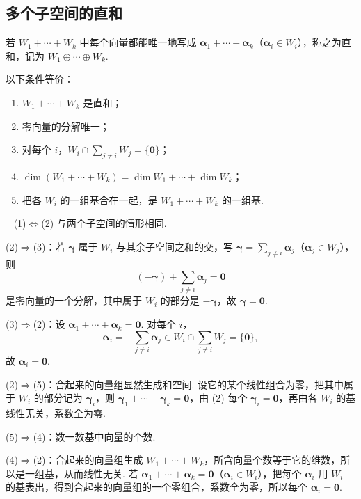 \documentclass[lang=cn,10.5pt,scheme=chinese,toc=twocol,section,chinesefont=nofont,
twoside,citestyle=gb7714-2015,bibstyle=gb7714-2015]{elegantbook}
\newcommand{\vv}[1]{\boldsymbol{#1}}
\newcommand{\zero}{\boldsymbol{0}}          %
\numberwithin{equation}{section}   %
\newcommand*{\lnlabel}[1]{{\sffamily\bfseries\color{black}#1}}
\renewenvironment{proof}{%
	\par\noindent\lnlabel{\proofname}\;\ \color{black!90}\cfs}{\par}
\begin{document}
\subsection{多个子空间的直和}

\begin{definition}
  若 $W_1+\cdots+W_k$ 中每个向量都能唯一地写成 $\vv\alpha_1+\cdots+\vv\alpha_k$（$\vv\alpha_i\in W_i$），称之为直和，记为 $W_1\oplus\cdots\oplus W_k$.
\end{definition}

\begin{theorem}
  \label{thm:dsummulti}
  以下条件等价：
  \begin{enumerate}
    \item $W_1+\cdots+W_k$ 是直和；
    \item 零向量的分解唯一；
    \item 对每个 $i$，$W_i\cap\sum_{j\ne i}W_j=\{\zero\}$；
    \item $\dim(W_1+\cdots+W_k)=\dim W_1+\cdots+\dim W_k$；
    \item 把各 $W_i$ 的一组基合在一起，是 $W_1+\cdots+W_k$ 的一组基.
  \end{enumerate}
\end{theorem}
\begin{proof}
  (1)$\Leftrightarrow$(2) 与两个子空间的情形相同.

  (2)$\Rightarrow$(3)：若 $\vv\gamma$ 属于 $W_i$ 与其余子空间之和的交，写 $\vv\gamma=\sum_{j\ne i}\vv\alpha_j$（$\vv\alpha_j\in W_j$），则
  \[(-\vv\gamma)+\sum_{j\ne i}\vv\alpha_j=\zero\]
  是零向量的一个分解，其中属于 $W_i$ 的部分是 $-\vv\gamma$，故 $\vv\gamma=\zero$.

  (3)$\Rightarrow$(2)：设 $\vv\alpha_1+\cdots+\vv\alpha_k=\zero$. 对每个 $i$，
  \[\vv\alpha_i=-\sum_{j\ne i}\vv\alpha_j\in W_i\cap\sum_{j\ne i}W_j=\{\zero\},\]
  故 $\vv\alpha_i=\zero$.

  (2)$\Rightarrow$(5)：合起来的向量组显然生成和空间. 设它的某个线性组合为零，把其中属于 $W_i$ 的部分记为 $\vv\gamma_i$，则 $\vv\gamma_1+\cdots+\vv\gamma_k=\zero$，由 (2) 每个 $\vv\gamma_i=\zero$，再由各 $W_i$ 的基线性无关，系数全为零.

  (5)$\Rightarrow$(4)：数一数基中向量的个数.

  (4)$\Rightarrow$(2)：合起来的向量组生成 $W_1+\cdots+W_k$，所含向量个数等于它的维数，所以是一组基，从而线性无关. 若 $\vv\alpha_1+\cdots+\vv\alpha_k=\zero$（$\vv\alpha_i\in W_i$），把每个 $\vv\alpha_i$ 用 $W_i$ 的基表出，得到合起来的向量组的一个零组合，系数全为零，所以每个 $\vv\alpha_i=\zero$.
\end{proof}
\end{document}
